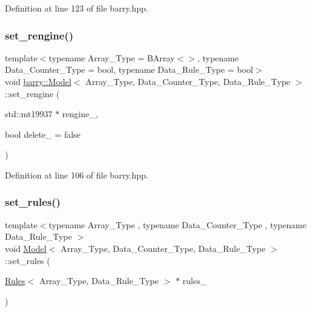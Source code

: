 Definition at line 123 of file barry.\+hpp.

\mbox{\label{classbarry_1_1_model_a1e1cdb67d12968394dbd68dad0cff208}} 
\subsubsection{\texorpdfstring{set\+\_\+rengine()}{set\_rengine()}}
{\footnotesize\ttfamily template$<$typename Array\+\_\+\+Type  = B\+Array$<$$>$, typename Data\+\_\+\+Counter\+\_\+\+Type  = bool, typename Data\+\_\+\+Rule\+\_\+\+Type  = bool$>$ \\
void \hyperlink{classbarry_1_1_model}{barry\+::\+Model}$<$ Array\+\_\+\+Type, Data\+\_\+\+Counter\+\_\+\+Type, Data\+\_\+\+Rule\+\_\+\+Type $>$\+::set\+\_\+rengine (\begin{DoxyParamCaption}\item[{std\+::mt19937 $\ast$}]{rengine\+\_\+,  }\item[{bool}]{delete\+\_\+ = {\ttfamily false} }\end{DoxyParamCaption})\hspace{0.3cm}{\ttfamily [inline]}}



Definition at line 106 of file barry.\+hpp.

\mbox{\label{classbarry_1_1_model_a86a46cf6fdc7c6514b97263f9ee4130b}} 
\subsubsection{\texorpdfstring{set\+\_\+rules()}{set\_rules()}}
{\footnotesize\ttfamily template$<$typename Array\+\_\+\+Type , typename Data\+\_\+\+Counter\+\_\+\+Type , typename Data\+\_\+\+Rule\+\_\+\+Type $>$ \\
void \hyperlink{classbarry_1_1_model}{Model}$<$ Array\+\_\+\+Type, Data\+\_\+\+Counter\+\_\+\+Type, Data\+\_\+\+Rule\+\_\+\+Type $>$\+::set\+\_\+rules (\begin{DoxyParamCaption}\item[{\hyperlink{classbarry_1_1_rules}{Rules}$<$ Array\+\_\+\+Type, Data\+\_\+\+Rule\+\_\+\+Type $>$ $\ast$}]{rules\+\_\+ }\end{DoxyParamCaption})\hspace{0.3cm}{\ttfamily [inline]}}



